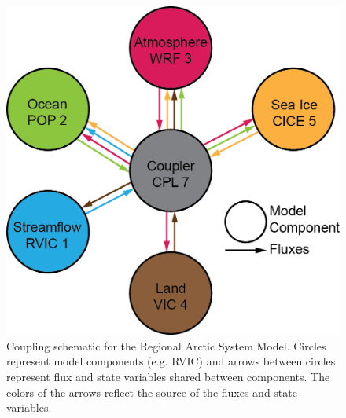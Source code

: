 \documentclass[jgrga, draft]{agutex}
\begin{document}
\begin{article}




%
%
\end{article}


%
%
%
%

\clearpage
\begin{figure}
\noindent\includegraphics[width=40pc,natwidth=1]{RASM_coupling_schematic}
\caption{Coupling schematic for the Regional Arctic System Model. Circles represent model components (e.g. RVIC) and arrows between circles represent flux and state variables shared between components. The colors of the arrows reflect the source of the fluxes and state variables.}
\label{fig:rasm_coupling_schematic}
\end{figure}
\end{document}
